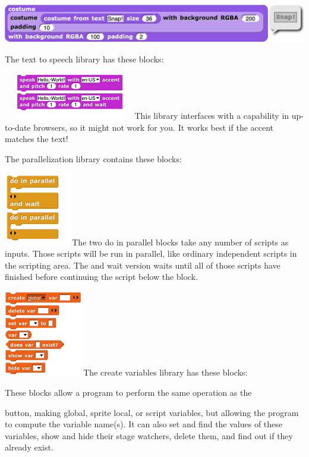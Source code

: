 \includegraphics[width=5.51in,height=0.68in]{media/image448.png}

The text to speech library has these blocks:

\includegraphics[width=2.275in,height=0.8in]{media/image449.png}This
library interfaces with a capability in up-to-date browsers, so it might
not work for you. It works best if the accent matches the text!

The parallelization library contains these blocks:

\includegraphics[width=1.17986in,height=1.25972in]{media/image450.png}The
two do in parallel blocks take any number of scripts as inputs. Those
scripts will be run in parallel, like ordinary independent scripts in
the scripting area. The and wait version waits until all of those
scripts have finished before continuing the script below the block.

\includegraphics[width=1.37778in,height=1.48333in]{media/image451.png}The
create variables library has these blocks:

These blocks allow a program to perform the same operation as the

button, making global, sprite local, or script variables, but allowing
the program to compute the variable name(s). It can also set and find
the values of these variables, show and hide their stage watchers,
delete them, and find out if they already exist.

